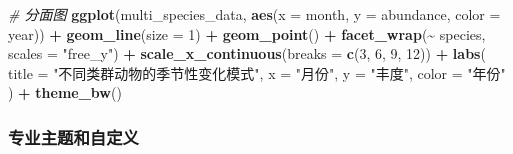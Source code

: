 \documentclass[
  twoside]{book}
\newenvironment{Shaded}{\begin{snugshade}}{\end{snugshade}}
\newcommand{\AttributeTok}[1]{\textcolor[rgb]{0.13,0.29,0.53}{#1}}
\newcommand{\CommentTok}[1]{\textcolor[rgb]{0.56,0.35,0.01}{\textit{#1}}}
\newcommand{\DecValTok}[1]{\textcolor[rgb]{0.00,0.00,0.81}{#1}}
\newcommand{\FunctionTok}[1]{\textcolor[rgb]{0.13,0.29,0.53}{\textbf{#1}}}
\newcommand{\NormalTok}[1]{#1}
\newcommand{\SpecialCharTok}[1]{\textcolor[rgb]{0.81,0.36,0.00}{\textbf{#1}}}
\newcommand{\StringTok}[1]{\textcolor[rgb]{0.31,0.60,0.02}{#1}}
\begin{document}
\begin{Shaded}
\begin{Highlighting}[]
\CommentTok{\# 分面图}
\FunctionTok{ggplot}\NormalTok{(multi\_species\_data, }\FunctionTok{aes}\NormalTok{(}\AttributeTok{x =}\NormalTok{ month, }\AttributeTok{y =}\NormalTok{ abundance, }\AttributeTok{color =}\NormalTok{ year)) }\SpecialCharTok{+}
  \FunctionTok{geom\_line}\NormalTok{(}\AttributeTok{size =} \DecValTok{1}\NormalTok{) }\SpecialCharTok{+}
  \FunctionTok{geom\_point}\NormalTok{() }\SpecialCharTok{+}
  \FunctionTok{facet\_wrap}\NormalTok{(}\SpecialCharTok{\textasciitilde{}}\NormalTok{ species, }\AttributeTok{scales =} \StringTok{"free\_y"}\NormalTok{) }\SpecialCharTok{+}
  \FunctionTok{scale\_x\_continuous}\NormalTok{(}\AttributeTok{breaks =} \FunctionTok{c}\NormalTok{(}\DecValTok{3}\NormalTok{, }\DecValTok{6}\NormalTok{, }\DecValTok{9}\NormalTok{, }\DecValTok{12}\NormalTok{)) }\SpecialCharTok{+}
  \FunctionTok{labs}\NormalTok{(}
    \AttributeTok{title =} \StringTok{"不同类群动物的季节性变化模式"}\NormalTok{,}
    \AttributeTok{x =} \StringTok{"月份"}\NormalTok{,}
    \AttributeTok{y =} \StringTok{"丰度"}\NormalTok{,}
    \AttributeTok{color =} \StringTok{"年份"}
\NormalTok{  ) }\SpecialCharTok{+}
  \FunctionTok{theme\_bw}\NormalTok{()}
\end{Highlighting}
\end{Shaded}

\hypertarget{ux4e13ux4e1aux4e3bux9898ux548cux81eaux5b9aux4e49}{%
\subsubsection{专业主题和自定义}\label{ux4e13ux4e1aux4e3bux9898ux548cux81eaux5b9aux4e49}}
\end{document}
